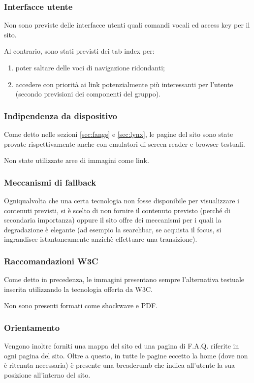 \subsubsection{Interfacce utente}
Non sono previste delle interfacce utenti quali comandi vocali ed access key
per il sito.

Al contrario, sono stati previsti dei tab index per:
\begin{enumerate}
\item poter saltare delle voci di navigazione ridondanti;
\item accedere con priorità ai link potenzialmente più interessanti per
l'utente (secondo previsioni dei componenti del gruppo).
\end{enumerate}

\subsubsection{Indipendenza da dispositivo}
Come detto nelle sezioni \ref{sec:fangs} e \ref{sec:lynx}, le pagine del sito
sono state provate rispettivamente anche con emulatori di screen reader e
browser testuali.

Non state utilizzate aree di immagini come link.

\subsubsection{Meccanismi di fallback}
Ogniqualvolta che una certa tecnologia non fosse disponibile per visualizzare i
contenuti previsti, si è scelto di non fornire il contenuto previsto (perché
di secondaria importanza) oppure il sito offre dei meccanismi per i quali la
degradazione è elegante (ad esempio la searchbar, se acquista il focus, si
ingrandisce istantaneamente anzichè effettuare una transizione).

\subsubsection{Raccomandazioni W3C}
Come detto in precedenza, le immagini presentano sempre l'alternativa testuale
inserita utilizzando la tecnologia offerta da W3C.

Non sono presenti formati come shockwave e PDF.

\subsubsection{Orientamento}
Vengono inoltre forniti una mappa del sito ed una pagina di F.A.Q. riferite in
ogni pagina del sito. Oltre a questo, in tutte le pagine eccetto la home (dove
non è ritenuta necessaria) è presente una breadcrumb che indica all'utente la
sua posizione all'interno del sito.

